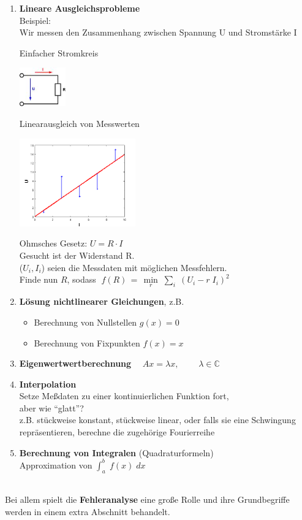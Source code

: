 \begin{enumerate}
\item \textbf{Lineare Ausgleichsprobleme}\\
  Beispiel:\\
  Wir messen den Zusammenhang zwischen Spannung U und
  Stromstärke I
\begin{image}{Einfacher Stromkreis}
  \parbox[c]{3cm}{\includegraphics[width=2cm]{images/ohmsche.jpeg} }
\end{image}
\begin{image}{Linearausgleich von Messwerten}
  \parbox[c]{6cm}{\includegraphics[width=5cm]{images/linausgl2.png}}
\end{image}
  Ohmsches Gesetz: $U = R \cdot I$\\
  Gesucht ist der Widerstand R. \\
  ($U_i, I_i$) seien die Messdaten mit möglichen Messfehlern.\\
  Finde nun $R$, sodass 
  $\; f(R)\, =\,  \min\limits_r \; \sum\limits_i \; (U_i - r \; I_i)^2$
  
\item \textbf{Lösung nichtlinearer Gleichungen},
  z.B.
  \begin{itemize}
  \item Berechnung von Nullstellen $g(x) = 0$
  \item Berechnung von Fixpunkten $f(x) = x$
  \end{itemize}  
\item \textbf{Eigenwertwertberechnung}
  $\quad Ax= \lambda x, \qquad \; \lambda \in \mathbb{C}$
  
  
\item \textbf{Interpolation}\\
  Setze Meßdaten zu einer kontinuierlichen Funktion fort, \\
  aber wie \enquote{glatt}?\\
  z.B. stückweise konstant, stückweise linear, oder 
  falls sie
  eine Schwingung repräsentieren, berechne die zugehörige
  Fourierreihe  
  
\item \textbf{Berechnung von Integralen} (Quadraturformeln) \\ 
  Approximation von $\int_a^b \; f(x) \; dx$
\end{enumerate}~\\

Bei allem spielt die \textbf{Fehleranalyse} eine große Rolle und
ihre Grundbegriffe werden in einem extra Abschnitt behandelt.

